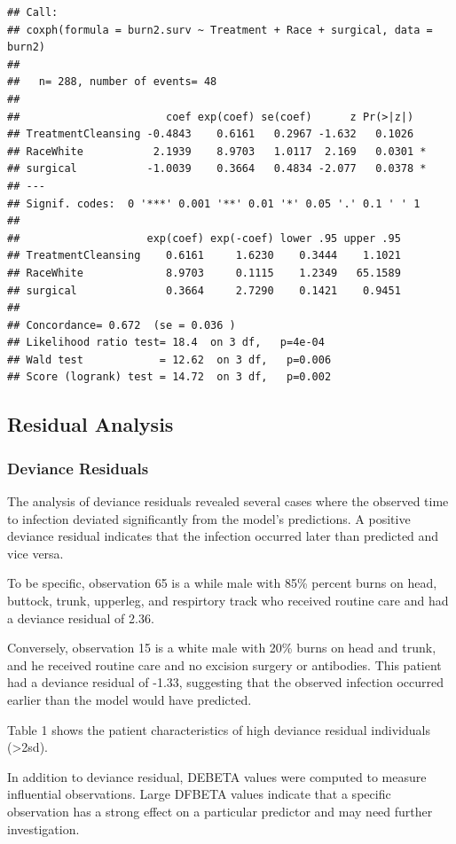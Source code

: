 \documentclass[12pt]{article}
\begin{document}
\begin{verbatim}
## Call:
## coxph(formula = burn2.surv ~ Treatment + Race + surgical, data = burn2)
## 
##   n= 288, number of events= 48 
## 
##                       coef exp(coef) se(coef)      z Pr(>|z|)  
## TreatmentCleansing -0.4843    0.6161   0.2967 -1.632   0.1026  
## RaceWhite           2.1939    8.9703   1.0117  2.169   0.0301 *
## surgical           -1.0039    0.3664   0.4834 -2.077   0.0378 *
## ---
## Signif. codes:  0 '***' 0.001 '**' 0.01 '*' 0.05 '.' 0.1 ' ' 1
## 
##                    exp(coef) exp(-coef) lower .95 upper .95
## TreatmentCleansing    0.6161     1.6230    0.3444    1.1021
## RaceWhite             8.9703     0.1115    1.2349   65.1589
## surgical              0.3664     2.7290    0.1421    0.9451
## 
## Concordance= 0.672  (se = 0.036 )
## Likelihood ratio test= 18.4  on 3 df,   p=4e-04
## Wald test            = 12.62  on 3 df,   p=0.006
## Score (logrank) test = 14.72  on 3 df,   p=0.002
\end{verbatim}

\subsection{Residual Analysis}\label{residual-analysis}

\subsubsection{Deviance Residuals}\label{deviance-residuals}

The analysis of deviance residuals revealed several cases where the
observed time to infection deviated significantly from the model's
predictions. A positive deviance residual indicates that the infection
occurred later than predicted and vice versa.

To be specific, observation 65 is a while male with 85\% percent burns
on head, buttock, trunk, upperleg, and respirtory track who received
routine care and had a deviance residual of 2.36.

Conversely, observation 15 is a white male with 20\% burns on head and
trunk, and he received routine care and no excision surgery or
antibodies. This patient had a deviance residual of -1.33, suggesting
that the observed infection occurred earlier than the model would have
predicted.

Table 1 shows the patient characteristics of high deviance residual
individuals (\textgreater2sd).

In addition to deviance residual, DEBETA values were computed to measure
influential observations. Large DFBETA values indicate that a specific
observation has a strong effect on a particular predictor and may need
further investigation.
\end{document}

